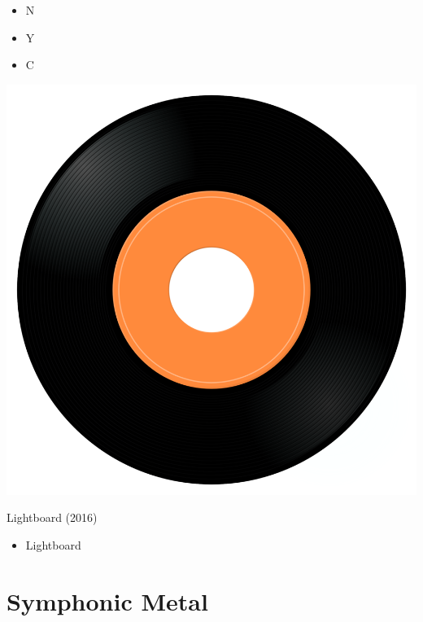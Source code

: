 \begin{minipage}[t]{0.25\textwidth}\vspace{0pt}
\begin{itemize}[nosep,leftmargin=1em,labelwidth=*,align=left]
	\setlength{\itemsep}{0pt}
	\item N
	\item Y
	\item C
\end{itemize}
\end{minipage}
\begin{minipage}[t]{0.25\textwidth}
\captionsetup{type=figure}
\includegraphics[width=\textwidth]{Images/cover.png}
\caption*{Lightboard (2016)}
\end{minipage}
\begin{minipage}[t]{0.25\textwidth}\vspace{0pt}
\begin{itemize}[nosep,leftmargin=1em,labelwidth=*,align=left]
	\setlength{\itemsep}{0pt}
	\item Lightboard
\end{itemize}
\end{minipage}


\section{Symphonic Metal}

